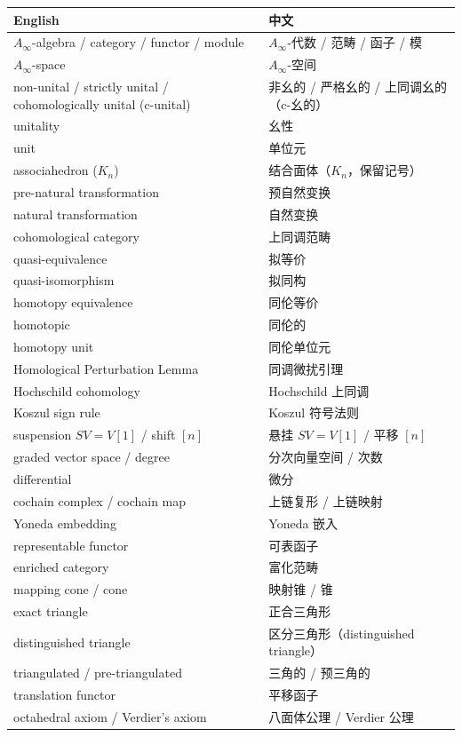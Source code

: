 {\small
\begin{longtable}{p{}p{}}
\toprule
English & 中文 \\
\midrule
\endhead
$A_\infty$-algebra / category / functor / module & $A_\infty$-代数 / 范畴 / 函子 / 模 \\
$A_\infty$-space & $A_\infty$-空间 \\
non-unital / strictly unital / cohomologically unital (c-unital) & 非幺的 / 严格幺的 / 上同调幺的（c-幺的） \\
unitality & 幺性 \\
unit & 单位元 \\
associahedron ($K_n$) & 结合面体（$K_n$，保留记号） \\
pre-natural transformation & 预自然变换 \\
natural transformation & 自然变换 \\
cohomological category & 上同调范畴 \\
quasi-equivalence & 拟等价 \\
quasi-isomorphism & 拟同构 \\
homotopy equivalence & 同伦等价 \\
homotopic & 同伦的 \\
homotopy unit & 同伦单位元 \\
Homological Perturbation Lemma & 同调微扰引理 \\
Hochschild cohomology & Hochschild 上同调 \\
Koszul sign rule & Koszul 符号法则 \\
suspension $SV=V[1]$ / shift $[n]$ & 悬挂 $SV=V[1]$ / 平移 $[n]$ \\
graded vector space / degree & 分次向量空间 / 次数 \\
differential & 微分 \\
cochain complex / cochain map & 上链复形 / 上链映射 \\
Yoneda embedding & Yoneda 嵌入 \\
representable functor & 可表函子 \\
enriched category & 富化范畴 \\
mapping cone / cone & 映射锥 / 锥 \\
exact triangle & 正合三角形 \\
distinguished triangle & 区分三角形（distinguished triangle） \\
triangulated / pre-triangulated & 三角的 / 预三角的 \\
translation functor & 平移函子 \\
octahedral axiom / Verdier's axiom & 八面体公理 / Verdier 公理 \\

\end{longtable}}
